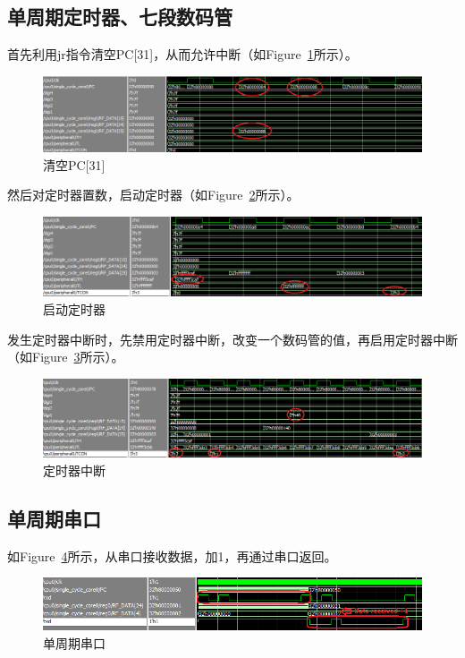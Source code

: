 \documentclass{article}
\begin{document}
        \subsection{\label{testdigi}单周期定时器、七段数码管}
            首先利用jr指令清空PC[31]，从而允许中断（如Figure~\ref{fig:singlecycle_digi1}所示）。
            \begin{figure}[H]
                \centering
                \includegraphics[width=\textwidth]{images/singlecycle_digi1.png}
                \caption{\label{fig:singlecycle_digi1}清空PC[31]}
            \end{figure}
            然后对定时器置数，启动定时器（如Figure~\ref{fig:singlecycle_digi2}所示）。
            \begin{figure}[H]
                \centering
                \includegraphics[width=\textwidth]{images/singlecycle_digi2.png}
                \caption{\label{fig:singlecycle_digi2}启动定时器}
            \end{figure}
            发生定时器中断时，先禁用定时器中断，改变一个数码管的值，再启用定时器中断（如Figure~\ref{fig:singlecycle_digi3}所示）。
            \begin{figure}[H]
                \centering
                \includegraphics[width=\textwidth]{images/singlecycle_digi3.png}
                \caption{\label{fig:singlecycle_digi3}定时器中断}
            \end{figure}

        \subsection{单周期串口}
            如Figure~\ref{fig:singlecycle_uart}所示，从串口接收数据，加1，再通过串口返回。
            \begin{figure}[H]
                \centering
                \includegraphics[width=\textwidth]{images/singlecycle_uart.png}
                \caption{\label{fig:singlecycle_uart}单周期串口}
            \end{figure}
\end{document}
